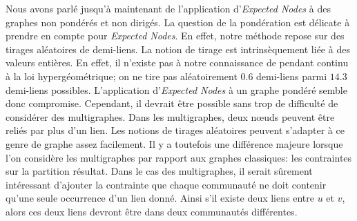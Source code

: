 Nous avons parlé jusqu'à maintenant de l'application d'\emph{Expected Nodes} à des graphes non pondérés et non dirigés.
La question de la pondération est délicate à prendre en compte pour \emph{Expected Nodes}.
En effet, notre méthode repose sur des tirages aléatoires de demi-liens.
La notion de tirage est intrinsèquement liée à des valeurs entières.
En effet, il n'existe pas à notre connaissance de pendant continu à la loi hypergéométrique;
on ne tire pas aléatoirement $0.6$ demi-liens parmi $14.3$ demi-liens possibles.
L'application d'\emph{Expected Nodes} à un graphe pondéré semble donc compromise.
Cependant, il devrait être possible  sans trop de difficulté de considérer des multigraphes.
Dans les multigraphes, deux n\oe{}uds peuvent être reliés par plus d'un lien.
Les notions de tirages aléatoires peuvent s'adapter à ce genre de graphe assez facilement.
Il y a toutefois une différence majeure lorsque l'on considère les multigraphes par rapport aux graphes classiques: les contraintes sur la partition résultat.
Dans le cas des multigraphes, il serait sûrement intéressant d'ajouter la contrainte que chaque communauté ne doit contenir qu'une seule occurrence d'un lien donné.
Ainsi s'il existe deux liens entre $u$ et $v$, alors ces deux liens devront être dans deux communautés différentes.
